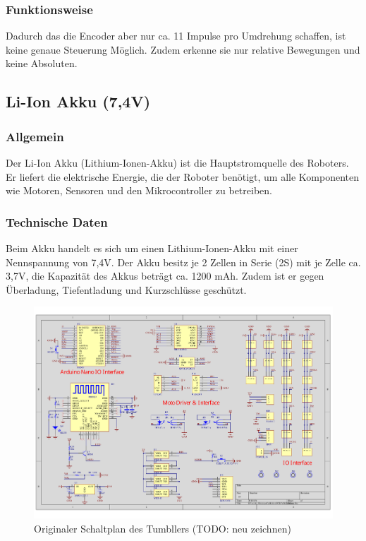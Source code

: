 \subsubsection{Funktionsweise}
Dadurch das die Encoder aber nur ca. 11 Impulse pro Umdrehung schaffen, ist keine genaue Steuerung Möglich. 
Zudem erkenne sie nur relative Bewegungen und keine Absoluten.
%
\subsection{Li-Ion Akku (7,4V)}
%
\subsubsection{Allgemein}
Der Li-Ion Akku (Lithium-Ionen-Akku) ist die Hauptstromquelle des Roboters. 
Er liefert die elektrische Energie, die der Roboter benötigt, um alle Komponenten wie Motoren, Sensoren und den Mikrocontroller zu betreiben.
\subsubsection{Technische Daten}
Beim Akku handelt es sich um einen Lithium-Ionen-Akku mit einer Nennspannung von 7,4V. 
Der Akku besitz je 2 Zellen in Serie (2S) mit je Zelle ca. 3,7V, die Kapazität des Akkus beträgt ca. 1200 mAh. Zudem ist er gegen Überladung, Tiefentladung und Kurzschlüsse geschützt. 
%
\begin{figure}
    \includegraphics[width=\textwidth, center]{img/elegoo_tumbller_original_circuit.pdf}
    \caption{Originaler Schaltplan des Tumbllers (TODO: neu zeichnen)}
    \label{fig:elegoo_tumbller_original_circuit}
\end{figure}

